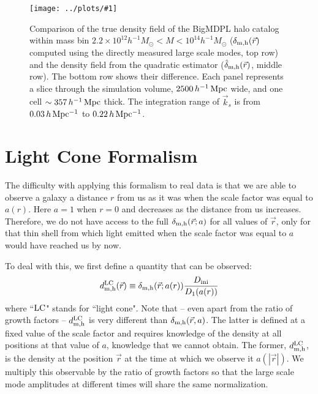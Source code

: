 \documentclass[prd,amsmath,amssymb,floatfix,superscriptaddress,nofootinbib,twocolumn]{revtex4-1}
\def\be{\begin{equation}}
\def\ee{\end{equation}}
\newcommand{\LC}{\rm LC}
\newcommand{\ini}{\rm ini}
\newcommand{\vrr}{\vec{r}}
\newcommand{\vk}{\vec{k}}
\newcommand{\eql}[1]{\label{eq:#1}}
\newcommand{\sfig}[2]{
\texttt{[image: ../plots/\#1]}
        }
\newcommand{\Sfig}[2]{
   \begin{figure}[thbp]
   \begin{center}
    \sfig{../plots/#1.pdf}{\columnwidth}
    \caption{{\small #2}}
    \label{fig:#1}
     \end{center}
   \end{figure}
}
\newcommand\dmh{\delta_{\rm m,h}}
\newcommand\hdmh{\hat{\delta}_{\rm m,h}}
\begin{document}
\Sfig{real_snap}{Comparison of the true density field of the BigMDPL halo catalog within mass bin $2.2 \times 10^{12}h^{-1}M_{\odot}<M < 10^{14}h^{-1}M_{\odot}$ ($\dmh(\vrr)$ computed using the directly measured large scale modes, top row) and the density field from the quadratic estimator ($\hdmh(\vrr)$, middle row). The bottom row shows their difference. Each panel represents a slice through the simulation volume, $2500\,h^{-1}\rm \, Mpc$ wide, and one cell $\sim 357\,h^{-1}\rm \, Mpc$ thick. The integration range of $\vk_{s}$ is from $0.03\, h \rm \, Mpc^{-1}$ to $0.22\, h \rm \, Mpc^{-1}$.}

\section{Light Cone Formalism} \label{sec4}

The difficulty with applying this formalism to real data is that we are able to observe a galaxy a distance $r$ from us as it was when the scale factor was equal to $a(r)$. Here $a=1$ when $r=0$ and decreases as the distance from us increases. Therefore, we do not have access to the full $\dmh(\vec r; a)$ for all values of $\vec r$, only for that thin shell from which light emitted when the scale factor was equal to $a$ would have reached us by now.

\newcommand\dlc{d^{\LC}_{\rm m,h}}
To deal with this, we first define a quantity that can be observed: 
\be
\dlc(\vrr) \equiv \dmh(\vrr;a(r)) \frac{D_{\ini}}{D_{1}(a(r))} \eql{LC}
\ee
where ``$\LC$" stands for ``light cone".  Note that -- even apart from the ratio of growth factors -- $\dlc$ is very different than $\dmh(\vrr, a)$. The latter is defined at a fixed value of the scale factor and requires knowledge of the density at all positions at that value of $a$, knowledge that we cannot obtain. The former, $\dlc$, is the density at the position $\vrr$ at the time at which we observe it $a(|\vrr|)$.
%
We multiply this observable by the ratio of growth factors so that the large scale mode amplitudes at different times will share the same normalization.
\end{document}
